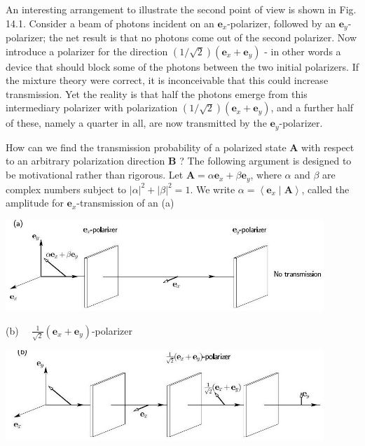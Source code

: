 \documentclass[hyperref,UTF8]{ctexbook}
\begin{document}
An interesting arrangement to illustrate the second point of view is shown in Fig. 14.1. Consider a beam of photons incident on an $\mathbf{e}_{x}$-polarizer, followed by an $\mathbf{e}_{y}$-polarizer; the net result is that no photons come out of the second polarizer. Now introduce a polarizer for the direction $(1 / \sqrt{2})\left(\mathbf{e}_{x}+\mathbf{e}_{y}\right)$ - in other words a device that should block some of the photons between the two initial polarizers. If the mixture theory were correct, it is inconceivable that this could increase transmission. Yet the reality is that half the photons emerge from this intermediary polarizer with polarization $(1 / \sqrt{2})\left(\mathbf{e}_{x}+\mathbf{e}_{y}\right)$, and a further half of these, namely a quarter in all, are now transmitted by the $\mathbf{e}_{y}$-polarizer.

How can we find the transmission probability of a polarized state $\mathbf{A}$ with respect to an arbitrary polarization direction $\mathbf{B}$ ? The following argument is designed to be motivational rather than rigorous. Let $\mathbf{A}=\alpha \mathbf{e}_{x}+\beta \mathbf{e}_{y}$, where $\alpha$ and $\beta$ are complex numbers subject to $|\alpha|^{2}+|\beta|^{2}=1$. We write $\alpha=\left\langle\mathbf{e}_{x} \mid \mathbf{A}\right\rangle$, called the amplitude for $\mathbf{e}_{x}$-transmission of an
(a)

\begin{center}
\includegraphics[width=12cm]{2023_12_20_5d48e1c38160b1e32b28g-03}
\end{center}

(b) $\quad \frac{1}{\sqrt{2}}\left(\mathbf{e}_{x}+\mathbf{e}_{y}\right)$-polarizer

\begin{center}
\includegraphics[width=12cm]{2023_12_20_5d48e1c38160b1e32b28g-03(1)}
\end{center}
\end{document}
